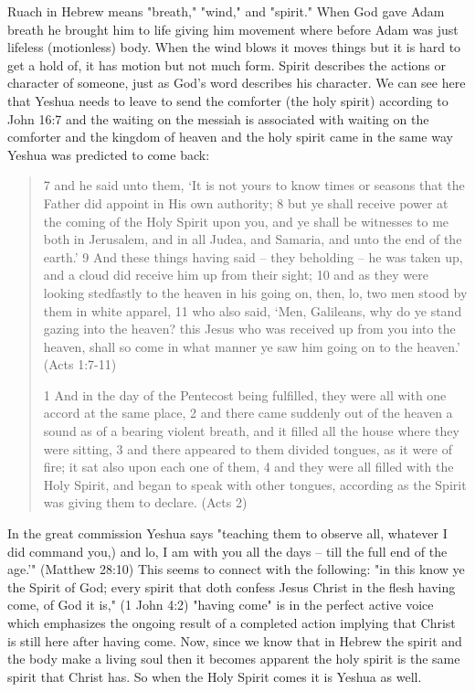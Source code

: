 \documentclass[11pt]{article}
\begin{document}
Ruach in Hebrew means "breath," "wind," and "spirit." When God gave Adam breath he brought him to life giving him movement where before Adam was just lifeless (motionless) body. When the wind blows it moves things but it is hard to get a hold of, it has motion but not much form. Spirit describes the actions or character of someone, just as God's word describes his character. We can see here that Yeshua needs to leave to send the comforter (the holy spirit) according to John 16:7 and the waiting on the messiah is associated with waiting on the comforter and the kingdom of heaven and the holy spirit came in the same way Yeshua was predicted to come back:

\begin{quote}
7 and he said unto them, `It is not yours to know times or seasons that the Father did appoint in His own authority;
8 but ye shall receive power at the coming of the Holy Spirit upon you, and ye shall be witnesses to me both in Jerusalem, and in all Judea, and Samaria, and unto the end of the earth.'
9 And these things having said -- they beholding -- he was taken up, and a cloud did receive him up from their sight;
10 and as they were looking stedfastly to the heaven in his going on, then, lo, two men stood by them in white apparel,
11 who also said, `Men, Galileans, why do ye stand gazing into the heaven? this Jesus who was received up from you into the heaven, shall so come in what manner ye saw him going on to the heaven.' (Acts 1:7-11)

1 And in the day of the Pentecost being fulfilled, they were all with one accord at the same place,
2 and there came suddenly out of the heaven a sound as of a bearing violent breath, and it filled all the house where they were sitting,
3 and there appeared to them divided tongues, as it were of fire; it sat also upon each one of them,
4 and they were all filled with the Holy Spirit, and began to speak with other tongues, according as the Spirit was giving them to declare. (Acts 2)
\end{quote}
In the great commission Yeshua says "teaching them to observe all, whatever I did command you,) and lo, I am with you all the days -- till the full end of the age.'" (Matthew 28:10) This seems to connect with the following: "in this know ye the Spirit of God; every spirit that doth confess Jesus Christ in the flesh having come, of God it is," (1 John 4:2) "having come" is in the perfect active voice which emphasizes the ongoing result of a completed action implying that Christ is still here after having come. Now, since we know that in Hebrew the spirit and the body make a living soul then it becomes apparent the holy spirit is the same spirit that Christ has. So when the Holy Spirit comes it is Yeshua as well. 
 
\end{document}
